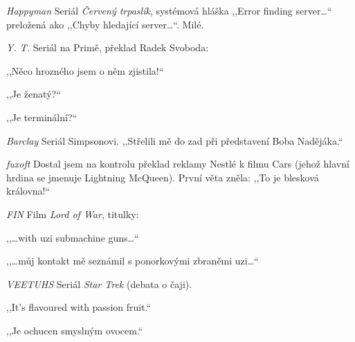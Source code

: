 \medskip

\noindent
\textit{Happyman} Seriál \textit{Červený trpaslík}, systémová hláška ,,Error finding server\ldots`` preložená ako ,,Chyby hledající server\ldots``. Milé.

\medskip

\noindent
\textit{Y. T.} Seriál na Primě, překlad Radek Svoboda: 

\noindent
,,Něco hrozného jsem o něm zjistila!``

\noindent
,,Je ženatý?``

\noindent
,,Je terminální?``

\medskip

\noindent
\textit{Barclay} Seriál Simpsonovi. ,,Střelili mě do zad při představení Boba Nadějáka.``

\medskip

\noindent
\textit{fuxoft} Dostal jsem na kontrolu překlad reklamy Nestlé k filmu Cars (jehož hlavní hrdina se jmenuje Lightning McQueen). První věta zněla: ,,To je blesková královna!``

\medskip

\noindent
\textit{FIN} Film \textit{Lord of War}, titulky: 

\noindent
,,\ldots with uzi submachine guns\ldots``  

\noindent
 ,,\ldots můj kontakt mě seznámil s ponorkovými zbraněmi uzi\ldots``

\medskip

\noindent
\textit{VEETUHS} Seriál \textit{Star Trek} (debata o čaji). 

\noindent
,,It's flavoured with passion fruit.``

\noindent
,,Je ochucen smyslným ovocem.``


